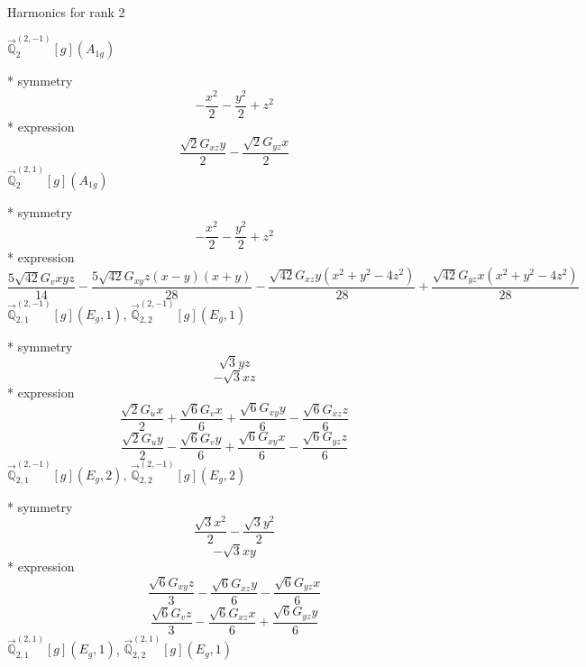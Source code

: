 \documentclass[fleqn,8pt]{jsarticle}
\begin{document}
\noindent * Harmonics for rank 2

\noindent\quad $\vec{\mathbb{Q}}_{2}^{(2,-1)}[g](A_{1g})$

\noindent\quad ** symmetry
\begin{dmath*}
- \frac{x^{2}}{2} - \frac{y^{2}}{2} + z^{2}
\end{dmath*}
\noindent\quad ** expression
\begin{dmath*}
\frac{\sqrt{2} G_{xz} y}{2} - \frac{\sqrt{2} G_{yz} x}{2}
\end{dmath*}
\noindent\quad $\vec{\mathbb{Q}}_{2}^{(2,1)}[g](A_{1g})$

\noindent\quad ** symmetry
\begin{dmath*}
- \frac{x^{2}}{2} - \frac{y^{2}}{2} + z^{2}
\end{dmath*}
\noindent\quad ** expression
\begin{dmath*}
\frac{5 \sqrt{42} G_{v} x y z}{14} - \frac{5 \sqrt{42} G_{xy} z \left(x - y\right) \left(x + y\right)}{28} - \frac{\sqrt{42} G_{xz} y \left(x^{2} + y^{2} - 4 z^{2}\right)}{28} + \frac{\sqrt{42} G_{yz} x \left(x^{2} + y^{2} - 4 z^{2}\right)}{28}
\end{dmath*}
\noindent\quad $\vec{\mathbb{Q}}_{2,1}^{(2,-1)}[g](E_{g},1)$, $\vec{\mathbb{Q}}_{2,2}^{(2,-1)}[g](E_{g},1)$

\noindent\quad ** symmetry
\begin{dmath*}
\sqrt{3} y z
\end{dmath*}
\begin{dmath*}
- \sqrt{3} x z
\end{dmath*}
\noindent\quad ** expression
\begin{dmath*}
\frac{\sqrt{2} G_{u} x}{2} + \frac{\sqrt{6} G_{v} x}{6} + \frac{\sqrt{6} G_{xy} y}{6} - \frac{\sqrt{6} G_{xz} z}{6}
\end{dmath*}
\begin{dmath*}
\frac{\sqrt{2} G_{u} y}{2} - \frac{\sqrt{6} G_{v} y}{6} + \frac{\sqrt{6} G_{xy} x}{6} - \frac{\sqrt{6} G_{yz} z}{6}
\end{dmath*}
\noindent\quad $\vec{\mathbb{Q}}_{2,1}^{(2,-1)}[g](E_{g},2)$, $\vec{\mathbb{Q}}_{2,2}^{(2,-1)}[g](E_{g},2)$

\noindent\quad ** symmetry
\begin{dmath*}
\frac{\sqrt{3} x^{2}}{2} - \frac{\sqrt{3} y^{2}}{2}
\end{dmath*}
\begin{dmath*}
- \sqrt{3} x y
\end{dmath*}
\noindent\quad ** expression
\begin{dmath*}
\frac{\sqrt{6} G_{xy} z}{3} - \frac{\sqrt{6} G_{xz} y}{6} - \frac{\sqrt{6} G_{yz} x}{6}
\end{dmath*}
\begin{dmath*}
\frac{\sqrt{6} G_{v} z}{3} - \frac{\sqrt{6} G_{xz} x}{6} + \frac{\sqrt{6} G_{yz} y}{6}
\end{dmath*}
\noindent\quad $\vec{\mathbb{Q}}_{2,1}^{(2,1)}[g](E_{g},1)$, $\vec{\mathbb{Q}}_{2,2}^{(2,1)}[g](E_{g},1)$
\end{document}
